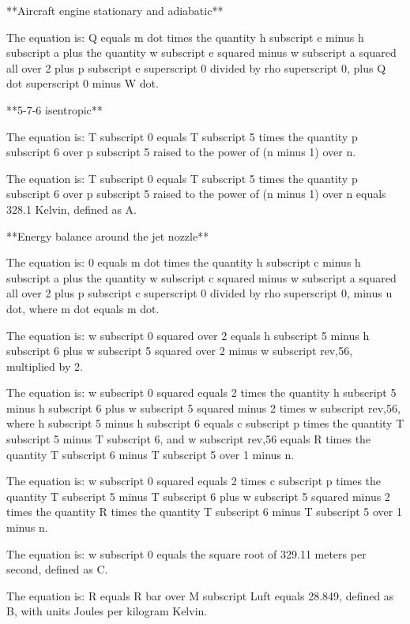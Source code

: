 **Aircraft engine stationary and adiabatic**

The equation is:
Q equals m dot times the quantity h subscript e minus h subscript a plus the quantity w subscript e squared minus w subscript a squared all over 2 plus p subscript e superscript 0 divided by rho superscript 0, plus Q dot superscript 0 minus W dot.

**5-7-6 isentropic**

The equation is:
T subscript 0 equals T subscript 5 times the quantity p subscript 6 over p subscript 5 raised to the power of (n minus 1) over n.

The equation is:
T subscript 0 equals T subscript 5 times the quantity p subscript 6 over p subscript 5 raised to the power of (n minus 1) over n equals 328.1 Kelvin, defined as A.

**Energy balance around the jet nozzle**

The equation is:
0 equals m dot times the quantity h subscript c minus h subscript a plus the quantity w subscript c squared minus w subscript a squared all over 2 plus p subscript c superscript 0 divided by rho superscript 0, minus u dot, where m dot equals m dot.

The equation is:
w subscript 0 squared over 2 equals h subscript 5 minus h subscript 6 plus w subscript 5 squared over 2 minus w subscript rev,56, multiplied by 2.

The equation is:
w subscript 0 squared equals 2 times the quantity h subscript 5 minus h subscript 6 plus w subscript 5 squared minus 2 times w subscript rev,56, where h subscript 5 minus h subscript 6 equals c subscript p times the quantity T subscript 5 minus T subscript 6, and w subscript rev,56 equals R times the quantity T subscript 6 minus T subscript 5 over 1 minus n.

The equation is:
w subscript 0 squared equals 2 times c subscript p times the quantity T subscript 5 minus T subscript 6 plus w subscript 5 squared minus 2 times the quantity R times the quantity T subscript 6 minus T subscript 5 over 1 minus n.

The equation is:
w subscript 0 equals the square root of 329.11 meters per second, defined as C.

The equation is:
R equals R bar over M subscript Luft equals 28.849, defined as B, with units Joules per kilogram Kelvin.